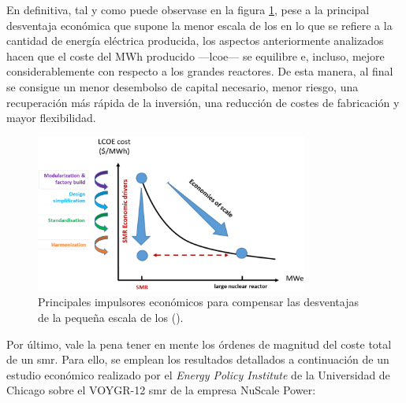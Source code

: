 En definitiva, tal y como puede observase en la figura \ref{fig:economy}, pese a la principal desventaja económica que supone la menor escala de los  en lo que se refiere a la cantidad de energía eléctrica producida, los aspectos anteriormente analizados hacen que el coste del MWh producido ---\acrfull{lcoe}--- se equilibre e, incluso, mejore considerablemente con respecto a los grandes reactores. De esta manera, al final se consigue un menor desembolso de capital necesario, menor riesgo, una recuperación más rápida de la inversión, una reducción de costes de fabricación y mayor flexibilidad.

\begin{figure}[h]
  \centering
  \includegraphics[width=0.8\textwidth]{content/figures/economy.png}
  \caption{Principales impulsores económicos para compensar las desventajas de la pequeña escala de los  (\cite{nea_smrs_2021}).}
  \label{fig:economy}
\end{figure}

Por último, vale la pena tener en mente los órdenes de magnitud del coste total de un \acrlong{smr}. Para ello, se emplean los resultados detallados a continuación de un estudio económico realizado por el \emph{Energy Policy Institute} de la Universidad de Chicago sobre el VOYGR-12 \acrshort{smr} de la empresa NuScale Power: 

